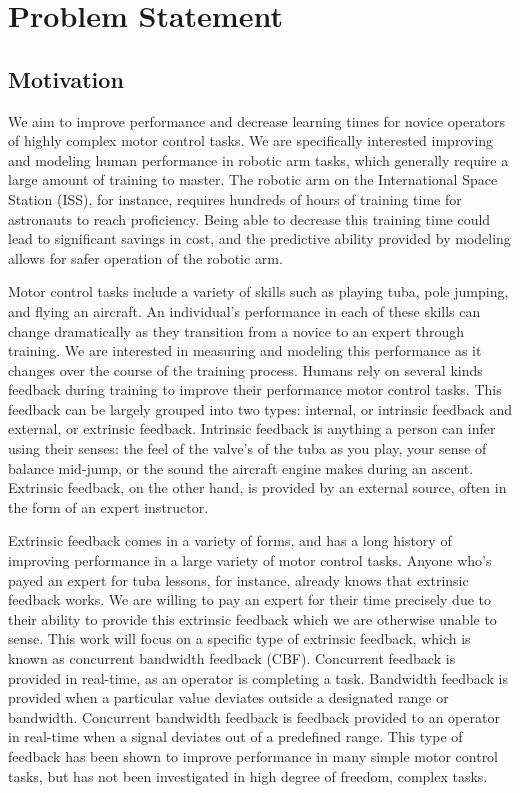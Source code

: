\documentclass[float=false, crop=false]{standalone}
\begin{document}
\section{Problem Statement}
\subsection{Motivation}
We aim to improve performance and decrease learning times for novice operators of highly complex motor control tasks.
We are specifically interested improving and modeling human performance in robotic arm tasks, which generally require a large amount of training to master.
The robotic arm on the International Space Station (ISS), for instance, requires hundreds of hours of training time for astronauts to reach proficiency.
Being able to decrease this training time could lead to significant savings in cost, and the predictive ability provided by modeling allows for safer operation of the robotic arm.

Motor control tasks include a variety of skills such as playing tuba, pole jumping, and flying an aircraft.
An individual's performance in each of these skills can change dramatically as they transition from a novice to an expert through training.
We are interested in measuring and modeling this performance as it changes over the course of the training process.
Humans rely on several kinds feedback during training to improve their performance motor control tasks.
This feedback can be largely grouped into two types: internal, or intrinsic feedback and external, or extrinsic feedback.
Intrinsic feedback is anything a person can infer using their senses: the feel of the valve’s of the tuba as you play, your sense of balance mid-jump, or the sound the aircraft engine makes during an ascent.
Extrinsic feedback, on the other hand, is provided by an external source, often in the form of an expert instructor.

Extrinsic feedback comes in a variety of forms, and has a long history of improving performance in a large variety of motor control tasks.
Anyone who's payed an expert for tuba lessons, for instance, already knows that extrinsic feedback works.
We are willing to pay an expert for their time precisely due to their ability to provide this extrinsic feedback which we are otherwise unable to sense.
This work will focus on a specific type of extrinsic feedback, which is known as concurrent bandwidth feedback (CBF).
Concurrent feedback is provided in real-time, as an operator is completing a task.
Bandwidth feedback is provided when a particular value deviates outside a designated range or bandwidth.
Concurrent bandwidth feedback is feedback provided to an operator in real-time when a signal deviates out of a predefined range.
This type of feedback has been shown to improve performance in many simple motor control tasks, but has not been investigated in high degree of freedom, complex tasks.
\end{document}
